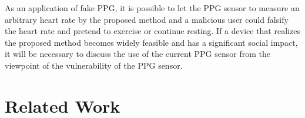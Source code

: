 \documentclass[sigchi,authordraft]{acmart}
\begin{document}
As an application of fake PPG, it is possible to let the PPG sensor to measure an arbitrary heart rate by the proposed method and a malicious user could falsify the heart rate and pretend to exercise or continue resting. If a device that realizes the proposed method becomes widely feasible and has a significant social impact, it will be necessary to discuss the use of the current PPG sensor from the viewpoint of the vulnerability of the PPG sensor.\par




\section{Related Work}
\label{sec:related}

\end{document}
